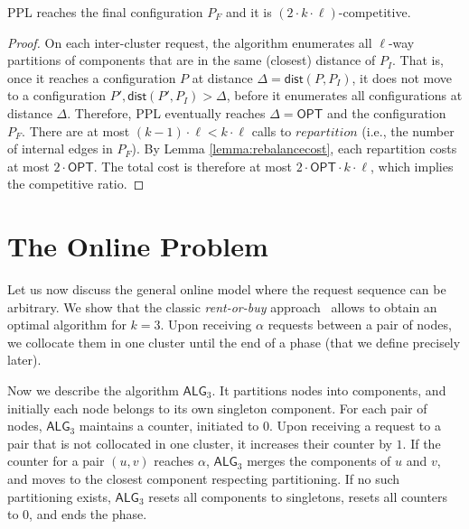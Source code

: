 \documentclass[manuscript,screen=true, review, anonymous]{acmart}
\newcommand{\OPT}{\textsf{OPT}\xspace}
\newcommand{\PPL}{\textsf{PPL}\xspace}
\newcommand{\OBRP}{BRP}
\newcommand{\dist}{\textsf{dist}}
\newcommand{\TAlg}{{\ensuremath{\textsf{ALG}_{3}}}\xspace} %
\newcommand\mahmoud[1]{\color{green}\textbf{\\ Mahmoud: #1}\\\color{black}}
\begin{document}
\begin{theorem}	\label{thm:upperbound}
    \PPL reaches the final configuration $P_F$ and it is $(2\cdot k\cdot\ell)$-competitive.
\end{theorem}
\begin{proof}
      On each inter-cluster request,
     the algorithm enumerates all $\ell$-way partitions of components
     that are in the same (closest) distance of $P_I$.
     That is, 
     once it reaches a configuration $P$ at distance $\Delta = \dist(P, P_I)$,
     it does not move to a configuration
     $P', \dist(P', P_I) > \Delta$,
     before it enumerates all configurations at distance $\Delta$.
     Therefore,
     \PPL eventually reaches $\Delta=\OPT$ and the configuration $P_F$.
    There are at most $(k-1)\cdot\ell < k\cdot\ell $ calls   to $\mathit{repartition}$
     (i.e., the number of internal edges in $P_F$).
    By Lemma \ref{lemma:rebalancecost},
    each repartition costs at most $2\cdot\OPT$.
    The total cost is therefore at most $2\cdot\OPT\cdot k\cdot\ell$, which implies the competitive ratio.
 \end{proof}

 
\section{The Online Problem}
\label{sec:k3}

Let us now discuss the general online
model where the request sequence
can be arbitrary. We show that the classic \emph{rent-or-buy} approach~\cite{karlin-ski-rental} allows to obtain an optimal algorithm for $k=3$.
Upon receiving $\alpha$ requests between a pair of nodes, we collocate them in one cluster until the end of a phase (that we define precisely later).

Now we describe the algorithm \TAlg.
It partitions nodes into components, and
initially each node belongs to its own singleton component.
For each pair of nodes, \TAlg maintains a counter, initiated to $0$. 
Upon receiving a request to a pair that is not collocated in one cluster, it increases their counter by $1$.
If the counter for a pair $(u,v)$ reaches $\alpha$, \TAlg merges the components of $u$ and $v$, and moves to the closest component respecting partitioning.
If no such partitioning exists, \TAlg resets all components to singletons, resets all counters to $0$, and ends the phase.
\end{document}
